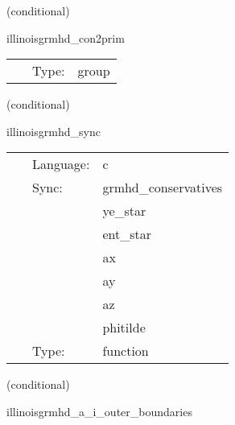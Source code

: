 \documentclass{article}
\begin{document}
   (conditional) 

\hspace{5mm} illinoisgrmhd\_con2prim 

\hspace{5mm}{\it compute primitive variables from conservatives } 


\hspace{5mm}

 \begin{tabular*}{160mm}{cll} 
~ & Type:  & group \\ 
\end{tabular*} 


\vspace{5mm}

   (conditional) 

\hspace{5mm} illinoisgrmhd\_sync 

\hspace{5mm}{\it sync conservative variable ghost zones for c2p routine } 


\hspace{5mm}

 \begin{tabular*}{160mm}{cll} 
~ & Language:  & c \\ 
~ & Sync:  & grmhd\_conservatives \\ 
~& ~ &ye\_star\\ 
~& ~ &ent\_star\\ 
~& ~ &ax\\ 
~& ~ &ay\\ 
~& ~ &az\\ 
~& ~ &phitilde\\ 
~ & Type:  & function \\ 
\end{tabular*} 


\vspace{5mm}

   (conditional) 

\hspace{5mm} illinoisgrmhd\_a\_i\_outer\_boundaries 



\hspace{5mm}
\end{document}
